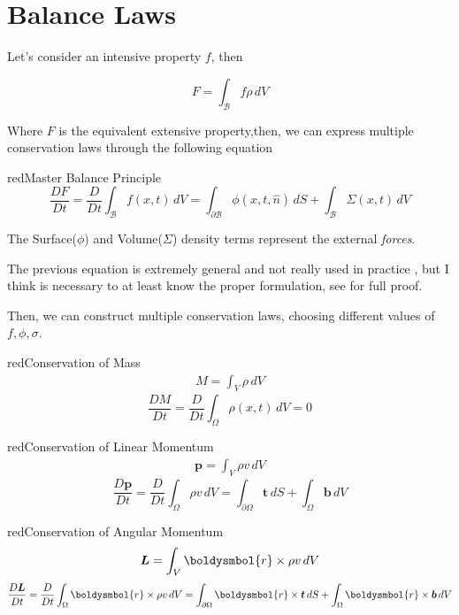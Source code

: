 \documentclass[a4paper, 11pt,article,oneside]{memoir}%
\begin{document}
\section{Balance Laws}
Let's consider an intensive property $f$, then
\begin{eqbox}
\begin{equation*}
F=\int_\mathcal{B} f\rho \,dV
\end{equation*}
\end{eqbox}
Where $F$ is the equivalent extensive property,then, we can express multiple conservation laws through the following equation 
\begin{eqbox2}{red}{Master Balance Principle}
\begin{equation*}
\frac{DF}{Dt}=\frac{D}{Dt}\int_\mathcal{B} f(x,t)\, dV=\int_{\partial \mathcal{B}}\phi(x,t,\hat{n})\,dS +\int_\mathcal{B} \Sigma(x,t) \,dV
\end{equation*}
\end{eqbox2}
The Surface($\phi$) and Volume($\Sigma$) density terms represent the external \textit{forces}. 
\begin{note}
The previous equation is extremely general and not really used in practice , but I think is necessary to at least know the proper formulation, see \cite{ICE2114} for full proof.
\end{note}
Then, we can construct multiple conservation laws, choosing different values of $f,\phi,\sigma$.
\begin{eqbox2}{red}{Conservation of Mass}
\begin{align*}
M=\int_V \rho \,dV
\end{align*}
\begin{equation*}
\frac{DM}{Dt}=\frac{D}{Dt}\int_\Omega \rho(x,t) \,dV=0
\end{equation*}
\end{eqbox2}
\begin{eqbox2}{red}{Conservation of Linear Momentum}
\begin{align*}
\boldsymbol{p}=\int_V \rho v \,dV
\end{align*}
\begin{equation*}
\frac{D\boldsymbol{p}}{Dt}=\frac{D}{Dt}\int_\Omega \rho v\, dV=\int_{\partial \Omega}\boldsymbol{t}\,dS +\int_\Omega \boldsymbol{b} \,dV
\end{equation*}
\end{eqbox2}
\begin{eqbox2}{red}{Conservation of Angular Momentum}
\begin{align*}
\boldsymbol{L}=\int_V  \boldysmbol{r}\times \rho v \,dV
\end{align*}
\begin{equation*}
\frac{D\boldsymbol{L}}{Dt}=\frac{D}{Dt}\int_\Omega \boldysmbol{r}\times\rho v\, dV=\int_{\partial \Omega}\boldysmbol{r}\times\boldsymbol{t}\,dS +\int_\Omega \boldysmbol{r}\times\boldsymbol{b} \,dV
\end{equation*}
\end{eqbox2}
\end{document}
